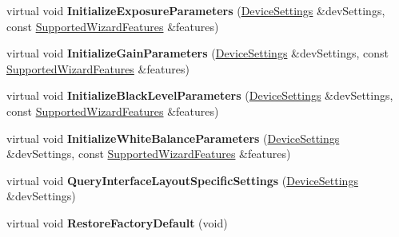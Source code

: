 \begin{DoxyCompactItemize}
\item 
\hypertarget{class_wizard_quick_setup_device_specific_ab563c29a9365ca5e2cf56c8a69a819b0}{virtual void {\bfseries Initialize\+Exposure\+Parameters} (\hyperlink{struct_wizard_quick_setup_1_1_device_settings}{Device\+Settings} \&dev\+Settings, const \hyperlink{struct_wizard_quick_setup_1_1_supported_wizard_features}{Supported\+Wizard\+Features} \&features)}\label{class_wizard_quick_setup_device_specific_ab563c29a9365ca5e2cf56c8a69a819b0}

\item 
\hypertarget{class_wizard_quick_setup_device_specific_ac3e6f647101197dc42478d1a471ce9b3}{virtual void {\bfseries Initialize\+Gain\+Parameters} (\hyperlink{struct_wizard_quick_setup_1_1_device_settings}{Device\+Settings} \&dev\+Settings, const \hyperlink{struct_wizard_quick_setup_1_1_supported_wizard_features}{Supported\+Wizard\+Features} \&features)}\label{class_wizard_quick_setup_device_specific_ac3e6f647101197dc42478d1a471ce9b3}

\item 
\hypertarget{class_wizard_quick_setup_device_specific_a0716e62c89d0be4ab4826e66cdebb198}{virtual void {\bfseries Initialize\+Black\+Level\+Parameters} (\hyperlink{struct_wizard_quick_setup_1_1_device_settings}{Device\+Settings} \&dev\+Settings, const \hyperlink{struct_wizard_quick_setup_1_1_supported_wizard_features}{Supported\+Wizard\+Features} \&features)}\label{class_wizard_quick_setup_device_specific_a0716e62c89d0be4ab4826e66cdebb198}

\item 
\hypertarget{class_wizard_quick_setup_device_specific_a6d0cd15a8d3a12a9dc05041bf5a1ad14}{virtual void {\bfseries Initialize\+White\+Balance\+Parameters} (\hyperlink{struct_wizard_quick_setup_1_1_device_settings}{Device\+Settings} \&dev\+Settings, const \hyperlink{struct_wizard_quick_setup_1_1_supported_wizard_features}{Supported\+Wizard\+Features} \&features)}\label{class_wizard_quick_setup_device_specific_a6d0cd15a8d3a12a9dc05041bf5a1ad14}

\item 
\hypertarget{class_wizard_quick_setup_device_specific_ab1c5ceef8fdf3ac9a0bec276081ccdc2}{virtual void {\bfseries Query\+Interface\+Layout\+Specific\+Settings} (\hyperlink{struct_wizard_quick_setup_1_1_device_settings}{Device\+Settings} \&dev\+Settings)}\label{class_wizard_quick_setup_device_specific_ab1c5ceef8fdf3ac9a0bec276081ccdc2}

\item 
\hypertarget{class_wizard_quick_setup_device_specific_a2a31f464830eb339cd22f39c992f8ee4}{virtual void {\bfseries Restore\+Factory\+Default} (void)}\label{class_wizard_quick_setup_device_specific_a2a31f464830eb339cd22f39c992f8ee4}


\end{DoxyCompactItemize}
